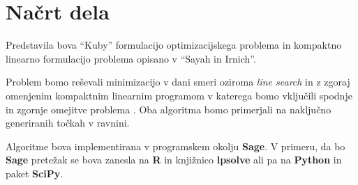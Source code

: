 \documentclass{article}
\begin{document}
\section{Načrt dela}

Predstavila bova ``Kuby''\cite{kuby1987programming} formulacijo optimizacijskega problema 
in kompaktno linearno formulacijo problema opisano v ``Sayah in Irnich''\cite{sayah2017new}.

Problem bomo reševali minimizacijo v dani smeri oziroma \textit{line search} in z 
zgoraj omenjenim kompaktnim linearnim programom v katerega bomo vključili spodnje in zgornje omejitve
problema \cite{sayah2017new}. Oba algoritma bomo primerjali na naključno generiranih
točkah v ravnini.

Algoritme bova implementirana v programskem okolju \textbf{Sage}. V primeru, da bo
\textbf{Sage} pretežak se bova zanesla na \textbf{R} in knjižnico \textbf{lpsolve}
ali pa na \textbf{Python} in paket \textbf{SciPy}.







\printindex
\end{document}
